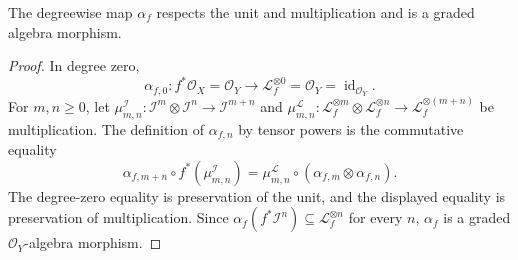 \begin{lemma}
  \label{lemma:nagata-blowup-universal-graded-map}
  \lean{}

  The degreewise map $\alpha_f$ respects the unit and multiplication and is a
  graded algebra morphism.
\end{lemma}

\begin{proof}
  In degree zero,
  \[
    \alpha_{f,0}\colon f^*\mathcal O_X=\mathcal O_Y
      \longrightarrow\mathcal L_f^{\otimes0}=\mathcal O_Y
      =\operatorname{id}_{\mathcal O_Y}.
  \]
  For $m,n\ge0$, let
  $\mu^{\mathcal I}_{m,n}\colon\mathcal I^m\otimes\mathcal I^n
  \to\mathcal I^{m+n}$ and
  $\mu^{\mathcal L}_{m,n}\colon\mathcal L_f^{\otimes m}\otimes
  \mathcal L_f^{\otimes n}\to\mathcal L_f^{\otimes(m+n)}$ be multiplication.
  The definition of $\alpha_{f,n}$ by tensor powers is the commutative
  equality
  \[
    \alpha_{f,m+n}\circ f^*(\mu^{\mathcal I}_{m,n})
      =\mu^{\mathcal L}_{m,n}\circ
        (\alpha_{f,m}\otimes\alpha_{f,n}).
  \]
  The degree-zero equality is preservation of the unit, and the displayed
  equality is preservation of multiplication.  Since
  $\alpha_f(f^*\mathcal I^n)\subseteq\mathcal L_f^{\otimes n}$ for every
  $n$, $\alpha_f$ is a graded $\mathcal O_Y$-algebra morphism.
\end{proof}

